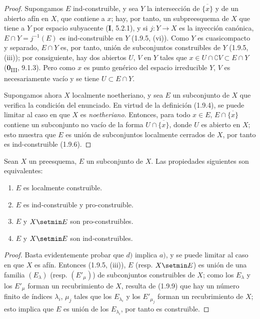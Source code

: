 \begin{proof}
Supongamos $E$ ind-construible, y sea $Y$ la intersección de
$\overline{\{x\}}$ y de un abierto afín en $X$, que contiene a $x$; hay,
por tanto, un subpreesquema de $X$ que tiene a $Y$ por espacio subyacente (\textbf{I}, 5.2.1),
y si $j:Y\to X$ es la inyección canónica,
$E\cap Y=j^{-1}(E)$ es ind-construible en $Y$ (1.9.5, (vi)). Como $Y$
es cuasicompacto y separado, $E\cap Y$ es, por tanto, unión de subconjuntos
construibles de $Y$ (1.9.5, (iii)); por consiguiente, hay dos abiertos $U$,
$V$ en $Y$ tales que
$x\in U\cap\complement V\subset E\cap Y$ (\textbf{0}\textsubscript{III}, 9.1.3).
Pero como $x$ es punto genérico del espacio irreducible $Y$, $V$ es
necesariamente vacío y se tiene $U\subset E\cap Y$.

Supongamos ahora $X$ localmente noetheriano, y sea $E$ un subconjunto de
$X$ que verifica la condición del enunciado. En virtud de la definición (1.9.4),
se puede limitar al caso en que $X$ es \emph{noetheriano}. Entonces, para todo $x\in E$,
$E\cap\overline{\{x\}}$ contiene un subconjunto no vacío de la forma
$U\cap\overline{\{x\}}$, donde $U$ es abierto en $X$; esto muestra que $E$
es unión de subconjuntos localmente cerrados de $X$, por tanto es
ind-construible (1.9.6).
\end{proof}

\begin{proposition}[1.9.11]
\label{IV.1.9.11-fr}
Sean $X$ un preesquema, $E$ un subconjunto de $X$. Las propiedades siguientes son
equivalentes:
\begin{enumerate}
  \item[a)] $E$ es localmente construible.
  \item[b)] $E$ es ind-construible y pro-construible.
  \item[c)] $E$ y $X\setmin E$ son pro-construibles.
  \item[d)] $E$ y $X\setmin E$ son ind-construibles.
\end{enumerate}
\end{proposition}

\begin{proof}
Basta evidentemente probar que $d)$ implica $a)$, y se puede limitar
al caso en que $X$ es afín. Entonces (1.9.5, (iii)), $E$ (resp. $X\setmin E$) es unión
de una familia $(E_\lambda)$ (resp. $(E'_\mu)$) de subconjuntos construibles de
$X$; como los $E_\lambda$ y los $E'_\mu$ forman un recubrimiento de $X$,
resulta de (1.9.9) que hay un número finito de índices $\lambda_i$,
$\mu_j$ tales que los $E_{\lambda_i}$ y los $E'_{\mu_j}$ forman un
recubrimiento de $X$; esto implica que $E$ es unión de los
$E_{\lambda_i}$, por tanto es construible.
\end{proof}

